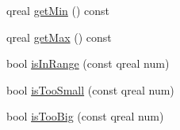 \begin{DoxyCompactItemize}
\item 
qreal \hyperlink{class_robot_model_1_1_interval_ac13db1c8d06222b4cc9247204e1e92f6}{getMin} () const 
\item 
qreal \hyperlink{class_robot_model_1_1_interval_ab64bca0594297b837f9f53b8b5d26b45}{getMax} () const 
\item 
bool \hyperlink{class_robot_model_1_1_interval_ae201eab3cef8bf4d1f9e7c0aa92c307b}{isInRange} (const qreal num)
\item 
bool \hyperlink{class_robot_model_1_1_interval_a712f69fa532fee66dc25944372886ddc}{isTooSmall} (const qreal num)
\item 
bool \hyperlink{class_robot_model_1_1_interval_a37e63af3b85ca706b9f5f62945709dce}{isTooBig} (const qreal num)
\end{DoxyCompactItemize}


